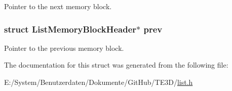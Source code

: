 Pointer to the next memory block. 

\hypertarget{struct_list_memory_block_header_a0a2cc3c0c86933e07d7871bc1fccdfe5}{
\subsubsection[{prev}]{\setlength{\rightskip}{0pt plus 5cm}struct {\bf List\-Memory\-Block\-Header}$\ast$ prev}}\label{struct_list_memory_block_header_a0a2cc3c0c86933e07d7871bc1fccdfe5}


Pointer to the previous memory block. 



The documentation for this struct was generated from the following file\-:\begin{DoxyCompactItemize}
\item 
E\-:/\-System/\-Benutzerdaten/\-Dokumente/\-Git\-Hub/\-T\-E3\-D/\hyperlink{list_8h}{list.\-h}\end{DoxyCompactItemize}
